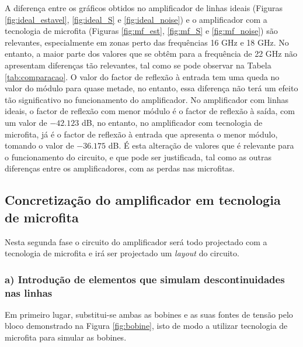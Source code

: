 \documentclass[11pt]{article}
\numberwithin{equation}{section}
\begin{document}
A diferença entre os gráficos obtidos no amplificador de linhas ideais (Figuras \ref{fig:ideal_estavel}, \ref{fig:ideal_S} e \ref{fig:ideal_noise}) e o amplificador com a tecnologia de microfita (Figuras \ref{fig:mf_est}, \ref{fig:mf_S} e \ref{fig:mf_noise}) são relevantes, especialmente em zonas perto das frequências 16 GHz e 18 GHz. No entanto, a maior parte dos valores que se obtêm para a frequência de 22 GHz não apresentam diferenças tão relevantes, tal como se pode observar na Tabela \ref{tab:comparacao}. O valor do factor de reflexão à entrada tem uma queda no valor do módulo para quase metade, no entanto, essa diferença não terá um efeito tão significativo no funcionamento do amplificador. No amplificador com linhas ideais, o factor de reflexão com menor módulo é o factor de reflexão à saída, com um valor de $-42.123$ dB, no entanto, no amplificador com tecnologia de microfita, já é o factor de reflexão à entrada que apresenta o menor módulo, tomando o valor de $-36.175$ dB. É esta alteração de valores que é relevante para o funcionamento do circuito, e que pode ser justificada, tal como as outras diferenças entre os amplificadores, com as perdas nas microfitas.

\subsection{Concretização do amplificador em tecnologia de microfita}

Nesta segunda fase o circuito do amplificador será todo projectado com a tecnologia de microfita e irá ser projectado um \textit{layout} do circuito.

\subsubsection{a) Introdução de elementos que simulam descontinuidades nas linhas}

Em primeiro lugar, substitui-se ambas as bobines e as suas fontes de tensão pelo bloco demonstrado na Figura \ref{fig:bobine}, isto de modo a utilizar tecnologia de microfita para simular as bobines. 
\end{document}
